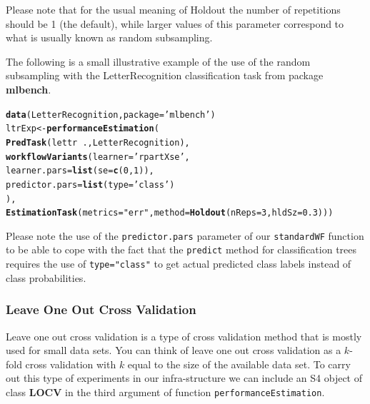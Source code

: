 \documentclass[10pt,a4paper]{article}\usepackage[]{graphicx}\usepackage[]{color}
\makeatletter
\newcommand{\hlnum}[1]{\textcolor[rgb]{0.686,0.059,0.569}{#1}}%
\newcommand{\hlstr}[1]{\textcolor[rgb]{0.192,0.494,0.8}{#1}}%
\newcommand{\hlopt}[1]{\textcolor[rgb]{0,0,0}{#1}}%
\newcommand{\hlstd}[1]{\textcolor[rgb]{0.345,0.345,0.345}{#1}}%
\newcommand{\hlkwb}[1]{\textcolor[rgb]{0.69,0.353,0.396}{#1}}%
\newcommand{\hlkwc}[1]{\textcolor[rgb]{0.333,0.667,0.333}{#1}}%
\newcommand{\hlkwd}[1]{\textcolor[rgb]{0.737,0.353,0.396}{\textbf{#1}}}%
\newenvironment{kframe}{%
 \def\at@end@of@kframe{}%
 \ifinner\ifhmode%
  \def\at@end@of@kframe{\end{minipage}}%
  \begin{minipage}{\columnwidth}%
 \fi\fi%
 \def\FrameCommand##1{\hskip\@totalleftmargin \hskip-\fboxsep
 \colorbox{shadecolor}{##1}\hskip-\fboxsep
     \hskip-\linewidth \hskip-\@totalleftmargin \hskip\columnwidth}%
 \MakeFramed {\advance\hsize-\width
   \@totalleftmargin\z@ \linewidth\hsize
   \@setminipage}}%
 {\par\unskip\endMakeFramed%
 \at@end@of@kframe}
\newenvironment{knitrout}{}{} %
\makeatother
\begin{document}
Please note that for the usual meaning of Holdout the number of repetitions should be 1 (the default), while larger values of this parameter correspond to what is usually known as random subsampling.

The following is a small illustrative example of the use of the
random subsampling with the LetterRecognition classification task from package
\textbf{mlbench}.

\begin{knitrout}\footnotesize
{}\color{fgcolor}\begin{kframe}
\begin{alltt}
\hlkwd{data}\hlstd{(LetterRecognition,}\hlkwc{package}\hlstd{=}\hlstr{'mlbench'}\hlstd{)}
\hlstd{ltrExp} \hlkwb{<-} \hlkwd{performanceEstimation}\hlstd{(}
    \hlkwd{PredTask}\hlstd{(lettr} \hlopt{~} \hlstd{.,LetterRecognition),}
    \hlkwd{workflowVariants}\hlstd{(}\hlkwc{learner}\hlstd{=}\hlstr{'rpartXse'}\hlstd{,}
                     \hlkwc{learner.pars}\hlstd{=}\hlkwd{list}\hlstd{(}\hlkwc{se}\hlstd{=}\hlkwd{c}\hlstd{(}\hlnum{0}\hlstd{,}\hlnum{1}\hlstd{)),}
                     \hlkwc{predictor.pars}\hlstd{=}\hlkwd{list}\hlstd{(}\hlkwc{type}\hlstd{=}\hlstr{'class'}\hlstd{)}
                     \hlstd{),}
    \hlkwd{EstimationTask}\hlstd{(}\hlkwc{metrics}\hlstd{=}\hlstr{"err"}\hlstd{,}\hlkwc{method}\hlstd{=}\hlkwd{Holdout}\hlstd{(}\hlkwc{nReps}\hlstd{=}\hlnum{3}\hlstd{,}\hlkwc{hldSz}\hlstd{=}\hlnum{0.3}\hlstd{)))}
\end{alltt}
\end{kframe}
\end{knitrout}

Please note the use of the \texttt{predictor.pars} parameter of our
\texttt{standardWF} function to be able to cope with the fact that
the \texttt{predict} method for classification trees requires the use
of \texttt{type="class"} to get actual predicted class labels instead
of class probabilities.

\subsubsection{Leave One Out Cross Validation}

Leave one out cross validation is a type of cross validation method
that is mostly used for small data sets. You can think of leave one
out cross validation as a $k$-fold cross validation with $k$ equal to
the size of the available data set. To carry out this type of
experiments in our infra-structure we can include an S4 object of
class \textbf{LOCV} in the third argument of function
\texttt{performanceEstimation}.
\end{document}
